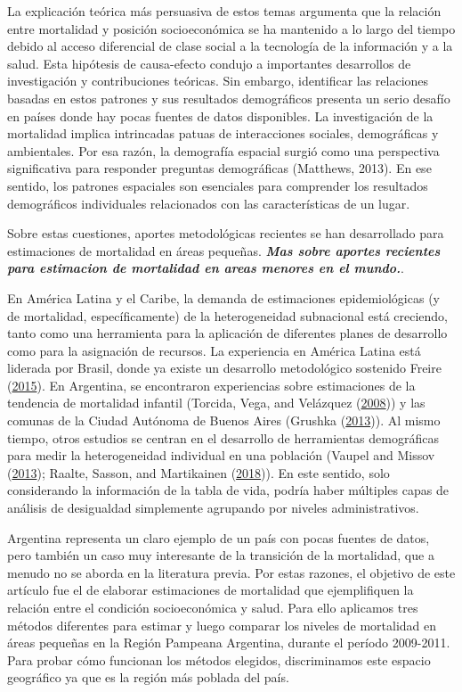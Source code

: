\documentclass[12pt,]{article}
\begin{document}
La explicación teórica más persuasiva de estos temas argumenta que la
relación entre mortalidad y posición socioeconómica se ha mantenido a lo
largo del tiempo debido al acceso diferencial de clase social a la
tecnología de la información y a la salud. Esta hipótesis de
causa-efecto condujo a importantes desarrollos de investigación y
contribuciones teóricas. Sin embargo, identificar las relaciones basadas
en estos patrones y sus resultados demográficos presenta un serio
desafío en países donde hay pocas fuentes de datos disponibles. La
investigación de la mortalidad implica intrincadas patuas de
interacciones sociales, demográficas y ambientales. Por esa razón, la
demografía espacial surgió como una perspectiva significativa para
responder preguntas demográficas (Matthews, 2013). En ese sentido, los
patrones espaciales son esenciales para comprender los resultados
demográficos individuales relacionados con las características de un
lugar.

Sobre estas cuestiones, aportes metodológicas recientes se han
desarrollado para estimaciones de mortalidad en áreas pequeñas.
\textbf{\emph{Mas sobre aportes recientes para estimacion de mortalidad
en areas menores en el mundo.}}.

En América Latina y el Caribe, la demanda de estimaciones
epidemiológicas (y de mortalidad, específicamente) de la heterogeneidad
subnacional está creciendo, tanto como una herramienta para la
aplicación de diferentes planes de desarrollo como para la asignación de
recursos. La experiencia en América Latina está liderada por Brasil,
donde ya existe un desarrollo metodológico sostenido Freire
(\protect\hyperlink{ref-FreireEtAl2015}{2015}). En Argentina, se
encontraron experiencias sobre estimaciones de la tendencia de
mortalidad infantil (Torcida, Vega, and Velázquez
(\protect\hyperlink{ref-torcida2008}{2008})) y las comunas de la Ciudad
Autónoma de Buenos Aires (Grushka
(\protect\hyperlink{ref-Grushka2013}{2013})). Al mismo tiempo, otros
estudios se centran en el desarrollo de herramientas demográficas para
medir la heterogeneidad individual en una población (Vaupel and Missov
(\protect\hyperlink{ref-Vaupel_Missov_2013}{2013}); Raalte, Sasson, and
Martikainen
(\protect\hyperlink{ref-vanRaalte_Sasson_Martikainen_2018}{2018})). En
este sentido, solo considerando la información de la tabla de vida,
podría haber múltiples capas de análisis de desigualdad simplemente
agrupando por niveles administrativos.

Argentina representa un claro ejemplo de un país con pocas fuentes de
datos, pero también un caso muy interesante de la transición de la
mortalidad, que a menudo no se aborda en la literatura previa. Por estas
razones, el objetivo de este artículo fue el de elaborar estimaciones de
mortalidad que ejemplifiquen la relación entre el condición
socioeconómica y salud. Para ello aplicamos tres métodos diferentes para
estimar y luego comparar los niveles de mortalidad en áreas pequeñas en
la Región Pampeana Argentina, durante el período 2009-2011. Para probar
cómo funcionan los métodos elegidos, discriminamos este espacio
geográfico ya que es la región más poblada del país.
\end{document}
